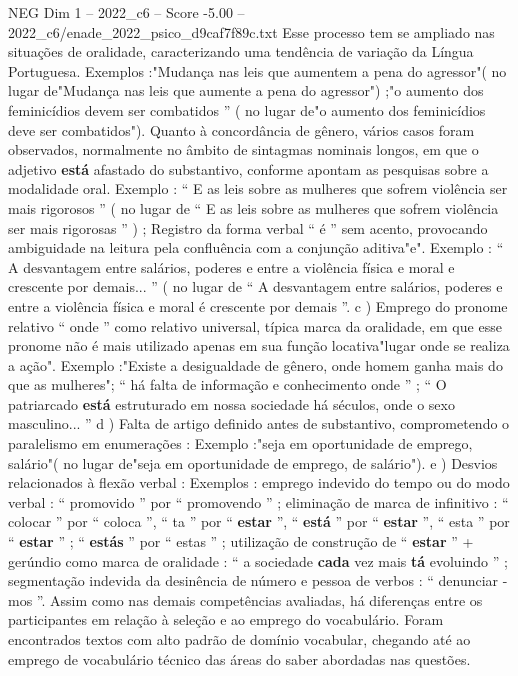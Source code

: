 \begin{textsample}{NEG Dim 1 – 2022\_c6 – Score -5.00 – 2022\_c6/enade\_2022\_psico\_d9caf7f89c.txt}
Esse processo tem se ampliado nas situações de oralidade, caracterizando uma tendência de variação da Língua Portuguesa.
Exemplos :"Mudança nas leis que aumentem a pena do agressor"( no lugar de"Mudança nas leis que aumente a pena do agressor") ;"o aumento dos feminicídios devem ser combatidos ” ( no lugar de"o aumento dos feminicídios deve ser combatidos").
Quanto à concordância de gênero, vários casos foram observados, normalmente no âmbito de sintagmas nominais longos, em que o adjetivo \textbf{está} afastado do substantivo, conforme apontam as pesquisas sobre a modalidade oral.
Exemplo : “ E as leis sobre as mulheres que sofrem violência ser mais rigorosos ” ( no lugar de “ E as leis sobre as mulheres que sofrem violência ser mais rigorosas ” ) ; Registro da forma verbal “ é ” sem acento, provocando ambiguidade na leitura pela confluência com a conjunção aditiva"e".
Exemplo : “ A desvantagem entre salários, poderes e entre a violência física e moral e crescente por demais... ” ( no lugar de “ A desvantagem entre salários, poderes e entre a violência física e moral é crescente por demais ”. c ) Emprego do pronome relativo “ onde ” como relativo universal, típica marca da oralidade, em que esse pronome não é mais utilizado apenas em sua função locativa"lugar onde se realiza a ação".
Exemplo :"Existe a desigualdade de gênero, onde homem ganha mais do que as mulheres"; “ há falta de informação e conhecimento onde ” ; “ O patriarcado \textbf{está} estruturado em nossa sociedade há séculos, onde o sexo masculino... ” d ) Falta de artigo definido antes de substantivo, comprometendo o paralelismo em enumerações : Exemplo :"seja em oportunidade de emprego, salário"( no lugar de"seja em oportunidade de emprego, de salário"). e ) Desvios relacionados à flexão verbal : Exemplos : emprego indevido do tempo ou do modo verbal : “ promovido ” por “ promovendo ” ; eliminação de marca de infinitivo : “ colocar ” por “ coloca ”, “ ta ” por “ \textbf{estar} ”, “ \textbf{está} ” por “ \textbf{estar} ”, “ esta ” por “ \textbf{estar} ” ; “ \textbf{estás} ” por “ estas ” ; utilização de construção de “ \textbf{estar} ” + gerúndio como marca de oralidade : “ a sociedade \textbf{cada} vez mais \textbf{tá} evoluindo ” ; segmentação indevida da desinência de número e pessoa de verbos : “ denunciar -mos ”.
Assim como nas demais competências avaliadas, há diferenças entre os participantes em relação à seleção e ao emprego do vocabulário.
Foram encontrados textos com alto padrão de domínio vocabular, chegando até ao emprego de vocabulário técnico das áreas do saber abordadas nas questões.

\end{textsample}
